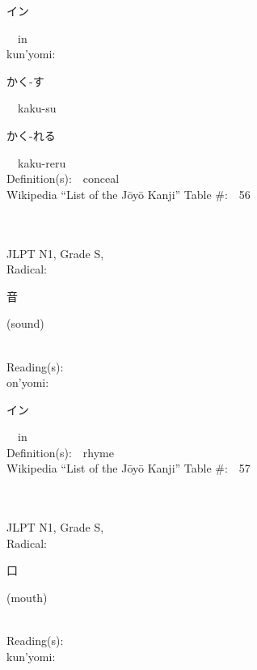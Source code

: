 \begin{multicols}{2}
{\hspace*{2em}}{\begin{CJK}{UTF8}{min} イン \end{CJK}}\ \ in\ \ \\
{\hspace*{1em}}kun'yomi:\ \ \\
{\hspace*{2em}}{\begin{CJK}{UTF8}{min} かく-す \end{CJK}}\ \ kaku-su\ \ \\
{\hspace*{2em}}{\begin{CJK}{UTF8}{min} かく-れる \end{CJK}}\ \ kaku-reru\ \ \\
Definition(s):\ \ conceal \\
Wikipedia ``List of the J\=oy\=o Kanji'' Table \#:\ \ 56 \\
\ \ \\
{\fontsize{34pt}{40pt}  }\ \ \\
{JLPT N1, Grade S, \\Radical:\ \ {\begin{CJK}{UTF8}{min} 音 \end{CJK}} (sound) } \\
Reading(s):\ \ \\
{\hspace*{1em}}on'yomi:\ \ \\
{\hspace*{2em}}{\begin{CJK}{UTF8}{min} イン \end{CJK}}\ \ in\ \ \\
Definition(s):\ \ rhyme \\
Wikipedia ``List of the J\=oy\=o Kanji'' Table \#:\ \ 57 \\
\ \ \\
{\fontsize{34pt}{40pt}  }\ \ \\
{JLPT N1, Grade S, \\Radical:\ \ {\begin{CJK}{UTF8}{min} 口 \end{CJK}} (mouth) } \\
Reading(s):\ \ \\
{\hspace*{1em}}kun'yomi:\ \ \\

\end{multicols}
